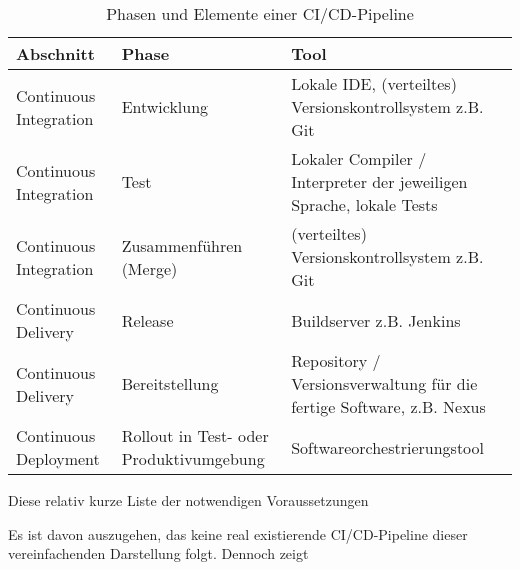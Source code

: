     \begin{table}[!h]
        \centering
        \begin{tabular}{|p{2cm}|p{4cm}|p{8cm}|}
            \hline
            Abschnitt & Phase & Tool\\
            \hline
            Continuous Integration & Entwicklung & Lokale \acrshort{IDE}, (verteiltes) Versionskontrollsystem z.B. Git\\
            \hline
            Continuous Integration & Test & Lokaler Compiler / Interpreter der jeweiligen Sprache, lokale Tests\\
            \hline
            Continuous Integration & Zusammenführen (Merge) & (verteiltes) Versionskontrollsystem z.B. Git\\
            \hline
            Continuous Delivery & Release & Buildserver z.B. Jenkins\\
            \hline
            Continuous Delivery & Bereitstellung & Repository / Versionsverwaltung für die fertige Software, z.B. Nexus \cite{zanini_integrating_2018}\\
            \hline
            Continuous Deployment & Rollout in Test- oder Produktivumgebung & Softwareorchestrierungstool\\
            \hline
        \end{tabular}
            \caption{Phasen und Elemente einer \acrshort{CI}/\acrshort{CD}-Pipeline}
            \label{Tabelle:Phasen und Elemente einer CICD-Pipeline}
    \end{table}
\newline
Diese relativ kurze Liste der notwendigen Voraussetzungen  



Es ist davon auszugehen, das keine real existierende \acrshort{CI}/\acrshort{CD}-Pipeline dieser vereinfachenden Darstellung folgt. Dennoch zeigt